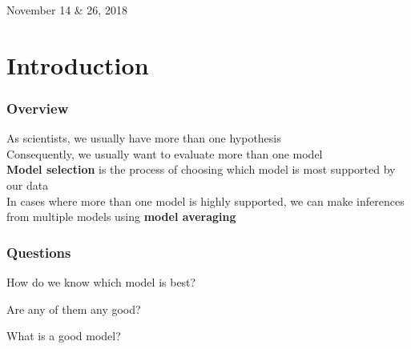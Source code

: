 \documentclass[color=usenames,dvipsnames]{beamer}\usepackage[]{graphicx}\usepackage[]{color}
\begin{document}



\begin{frame}[plain]
  \LARGE
  \centering \par
  {\color{NavyBlue}{ Model Selection and %
  Multimodel Inference \\}}
  \vspace{1cm}
  \large
  November 14 \& 26, 2018
\end{frame}


\section{Introduction}






\begin{frame}
  \frametitle{Overview}
  As scientists, we usually have more than one hypothesis \\
  \pause
  \vfill
  Consequently, we usually want to evaluate more than one model \\
  \pause
  \vfill
  {\bf Model selection} is the process of choosing which model is most
  supported by our data \\
  \pause
  \vfill
  In cases where more than one model is highly supported, we can make
  inferences from multiple models using {\bf model averaging} \\
\end{frame}



\begin{frame}
  \frametitle{Questions}
  \large
  {How do we know which model is best? \par}
  \pause
  \vspace{0.9cm}
  { Are any of them any good? \par}
  \pause
  \vspace{0.9cm}
  {What is a good model? \par}
\end{frame}
\end{document}
